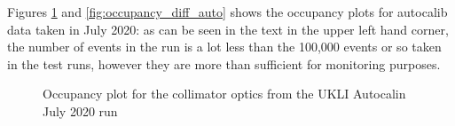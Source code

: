Figures \ref{fig:occupancy_coll_auto} and \ref{fig:occupancy_diff_auto} shows the occupancy plots for autocalib data taken in July 2020: as can be seen in the text in the upper left hand corner, the number of events in the run is a lot less than the 100,000 events or so taken in the test runs, however they are more than sufficient for monitoring purposes.

\begin{figure}[!htbp]
    \centering
    
    \caption{Occupancy plot for the collimator optics from the UKLI Autocalin July 2020 run} \label{fig:occupancy_coll_auto} 
    
     \hfill
     \par
     \hfill

\end{figure}
